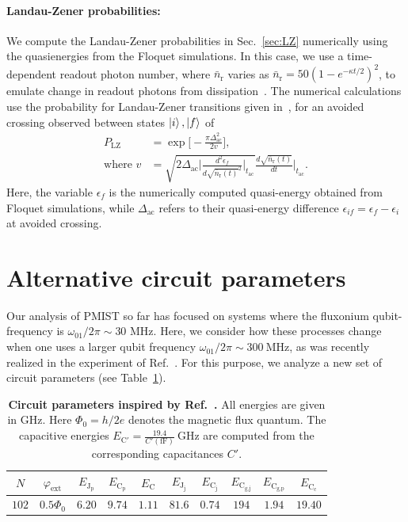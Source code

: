\documentclass[%
reprint,
superscriptaddress,
 amsmath,amssymb,
 aps,
 prx,
longbibliography,
floatfix,
]{revtex4-2}
\begin{document}
\paragraph{Landau-Zener probabilities:}\label{app:LZ}
We compute the Landau-Zener probabilities in Sec.~\ref{sec:LZ} numerically using the quasienergies from the Floquet simulations. In this case, we use a time-dependent readout photon number, where $\bar n_\textrm{r}$ varies as $\bar n_\textrm{r}=50(1-e^{-\kappa t/2})^2$, to emulate change in readout photons from dissipation~\cite{dumas2024unified,khezri2023measurement}. The numerical calculations use the probability for Landau-Zener transitions given in~\cite{ikeda2022floquet}, for an avoided crossing observed between states $\ket{i},\ket{f}$ of
\begin{align}
    P_\textrm{LZ}&=\exp{\Big[-\frac{\pi \Delta_\textrm{ac}^2}{2v}\Big]},\\
    \text{where } v&=\sqrt{2\Delta_\textrm{ac}\Bigg|\frac{d^2\epsilon_f}{d\sqrt{\bar{n}_\textrm{r}(t)}^2}\Bigg|_{t_\textrm{ac}}}\frac{d\sqrt{\bar{n}_\textrm{r}(t)}}{dt}\Bigg|_{t_\textrm{ac}} .
\end{align}
Here, the variable $\epsilon_f$ is the numerically computed quasi-energy obtained from Floquet simulations, while $\Delta_\textrm{ac}$ refers to their quasi-energy difference $\epsilon_{if}=\epsilon_f-\epsilon_i$ at avoided crossing. 

\section{Alternative circuit parameters}\label{Will_circuit}

Our analysis of PMIST so far has focused on systems where the fluxonium qubit-frequency is $\omega_{01} / 2 \pi \sim 30$ MHz. Here, we consider how these processes change when one uses a larger qubit frequency $\omega_{01}/2\pi \sim 300 \ \mathrm{MHz}$, as was recently realized in the experiment of Ref.~\cite{ding_high-fidelity_2023}. For this purpose, we analyze a new set of circuit parameters (see Table~\ref{tab:circuit_params_Will}).

\begin{table}[htb]
\centering
\begin{tabular}{|c|c|c|c|c|c|c|c|c|c|}
    \hline
     $N$ & $\varphi_{\textrm{ext}}$ & $E_{\textrm{J}_\textrm{p}}$ & $E_{\textrm{C}_\textrm{p}}$ & $E_{\textrm{C}}$ & $E_{\textrm{J}_\textrm{j}}$ & $E_{\textrm{C}_\textrm{j}}$ & $E_{\textrm{C}_\textrm{g,j}}$ & $E_{\textrm{C}_\textrm{g,p}}$ & $E_{\textrm{C}_\textrm{c}}$ \\
    \hline
    $102$ & $0.5\Phi_0$ & $6.20$ & $9.74$ & $1.11$ & $81.6$ &$0.74$  & $194$ & $1.94$ & $19.40$ \\
    \hline
\end{tabular}
\caption{\textbf{Circuit parameters inspired by Ref.~\cite{ding_high-fidelity_2023}.} All energies are given in GHz. Here $\Phi_0=h/2e$ denotes the magnetic flux quantum. The capacitive energies $E_{\textrm{C}'}=\frac{19.4}{{C'}(\mathrm{fF})} \ \mathrm{GHz}$ are computed from the corresponding capacitances $C'$.}
\label{tab:circuit_params_Will}
\end{table}
\end{document}
